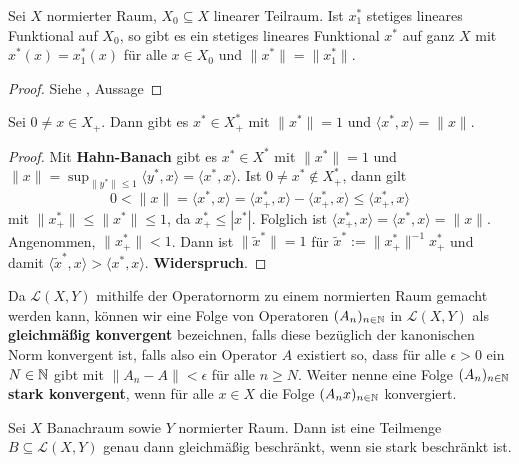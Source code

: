 \begin{fsatz}
Sei $X$ normierter Raum, $X_0\subseteq X$ linearer Teilraum. Ist $x_1^*$ stetiges lineares Funktional auf $X_0$, so gibt es ein stetiges lineares Funktional $x^*$ auf ganz $X$ mit $x^*(x)=x_1^*(x)$ für alle $x\in X_0$ und $\|x^*\|=\|x_1^*\|$.
\end{fsatz}

\begin{proof}
Siehe \cite{}, Aussage
\end{proof}

\begin{lem}\label{Lemma nach Hahn-Banach}
Sei $0\neq x\in X_+$. Dann gibt es $x^*\in X^*_+$ mit $\|x^*\|= 1$ und $\langle x^*, x\rangle = \|x\|$.
\end{lem}

\begin{proof}
Mit \textbf{Hahn-Banach} gibt es  $x^*\in X^*$ mit $\|x^*\| =1$ und  $\|x\| = \sup_{\|y^*\|\leq 1}\langle y^*, x\rangle = \langle x^*, x\rangle$. Ist $0\neq x^*\not\in X_+^*$, dann gilt
\begin{equation*}
0 < \|x\|=\langle x^*, x\rangle = \langle x_+^*, x\rangle - \langle x_+^*, x\rangle\leq \langle x_+^*, x\rangle
\end{equation*}
mit $\|x_+^*\|\leq \|x^*\|\leq 1$, da $x_+^*\leq |x^*|$. Folglich ist $\langle x_+^*, x\rangle = \langle x^*, x \rangle = \|x\|$. Angenommen,  $\|x^*_+\| < 1$. Dann ist $\|\widetilde{x}^*\|=1$ für $\widetilde{x}^*:= \|x_+^*\|^{-1} x_+^*$  und damit $\langle \widetilde{x}^*, x\rangle> \langle x^*, x\rangle$. \textbf{Widerspruch}. 
\end{proof}


Da $\mathcal L(X, Y)$ mithilfe der Operatornorm zu einem normierten Raum gemacht werden kann, können wir eine Folge von Operatoren $(A_n)_{n\in\mathbb{N}}$ in $\mathcal L(X,Y)$ als \textbf{gleichmäßig konvergent} bezeichnen, falls diese bezüglich der kanonischen Norm konvergent ist, falls also ein Operator $A$ existiert so, dass für alle $\epsilon> 0$ ein $N\in\mathbb{N}$ gibt mit $\|A_n-A\|< \epsilon $ für alle $n\geq N$. Weiter nenne eine Folge $(A_n)_{n\in\mathbb{N}}$  \textbf{stark konvergent}, wenn für alle $x\in X$ die Folge $(A_nx)_{n\in\mathbb{N}}$ konvergiert. 

\begin{fsatz}
Sei $X$ Banachraum sowie $Y$ normierter Raum. Dann ist eine Teilmenge $B\subseteq \mathcal L(X, Y)$ genau dann gleichmäßig beschränkt, wenn sie stark beschränkt ist.
\end{fsatz}

